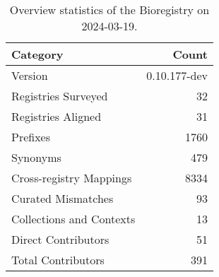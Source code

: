 \begin{table}
\caption{Overview statistics of the Bioregistry on 2024-03-19.}
\label{tab:bioregistry-summary}
\begin{tabular}{lr}
\toprule
Category & Count \\
\midrule
Version & 0.10.177-dev \\
Registries Surveyed & 32 \\
Registries Aligned & 31 \\
Prefixes & 1760 \\
Synonyms & 479 \\
Cross-registry Mappings & 8334 \\
Curated Mismatches & 93 \\
Collections and Contexts & 13 \\
Direct Contributors & 51 \\
Total Contributors & 391 \\
\bottomrule
\end{tabular}
\end{table}
